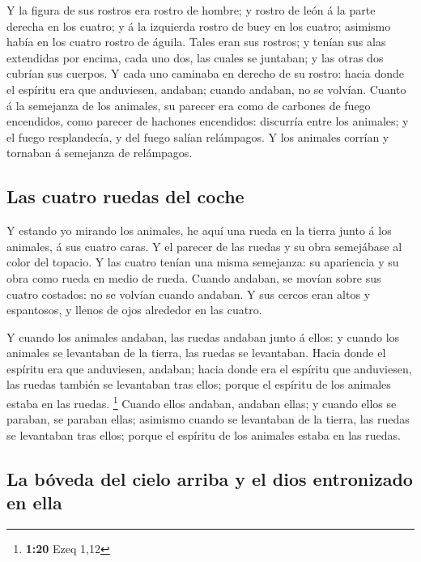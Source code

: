  Y la figura de sus rostros era rostro de hombre; y rostro
de león á la parte derecha en los cuatro; y á la izquierda rostro de
buey en los cuatro; asimismo había en los cuatro rostro de águila.
 Tales eran sus rostros; y tenían sus alas extendidas por
encima, cada uno dos, las cuales se juntaban; y las otras dos cubrían
sus cuerpos.  Y cada uno caminaba en derecho de su rostro:
hacia donde el espíritu era que anduviesen, andaban; cuando andaban, no
se volvían.  Cuanto á la semejanza de los animales, su
parecer era como de carbones de fuego encendidos, como parecer de
hachones encendidos: discurría entre los animales; y el fuego
resplandecía, y del fuego salían relámpagos.  Y los
animales corrían y tornaban á semejanza de relámpagos.

\hypertarget{las-cuatro-ruedas-del-coche}{%
\subsection{Las cuatro ruedas del
coche}\label{las-cuatro-ruedas-del-coche}}

 Y estando yo mirando los animales, he aquí una rueda en la
tierra junto á los animales, á sus cuatro caras.  Y el
parecer de las ruedas y su obra semejábase al color del topacio. Y las
cuatro tenían una misma semejanza: su apariencia y su obra como rueda en
medio de rueda.  Cuando andaban, se movían sobre sus cuatro
costados: no se volvían cuando andaban.  Y sus cercos eran
altos y espantosos, y llenos de ojos alrededor en las cuatro.

 Y cuando los animales andaban, las ruedas andaban junto á
ellos: y cuando los animales se levantaban de la tierra, las ruedas se
levantaban.  Hacia donde el espíritu era que anduviesen,
andaban; hacia donde era el espíritu que anduviesen, las ruedas también
se levantaban tras ellos; porque el espíritu de los animales estaba en
las ruedas. \footnote{\textbf{1:20} Ezeq 1,12}  Cuando
ellos andaban, andaban ellas; y cuando ellos se paraban, se paraban
ellas; asimismo cuando se levantaban de la tierra, las ruedas se
levantaban tras ellos; porque el espíritu de los animales estaba en las
ruedas.

\hypertarget{la-buxf3veda-del-cielo-arriba-y-el-dios-entronizado-en-ella}{%
\subsection{La bóveda del cielo arriba y el dios entronizado en
ella}\label{la-buxf3veda-del-cielo-arriba-y-el-dios-entronizado-en-ella}}

